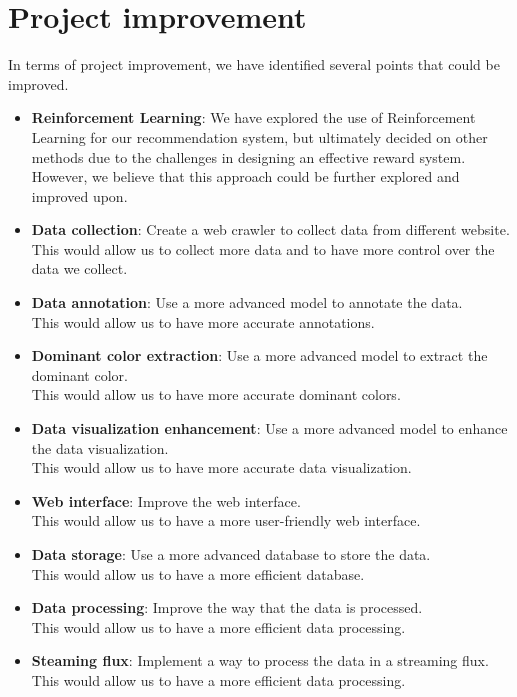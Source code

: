 \documentclass{article}
\begin{document}
    \section{Project improvement}\label{sec:project_improvement}
    In terms of project improvement, we have identified several points that could be improved.

    \begin{itemize}
        \item \textbf{Reinforcement Learning}: We have explored the use of Reinforcement Learning for our recommendation system, but ultimately decided on other methods due to the challenges in designing an effective reward system.\\However, we believe that this approach could be further explored and improved upon.
        \item \textbf{Data collection}: Create a web crawler to collect data from different website.\\This would allow us to collect more data and to have more control over the data we collect.
        \item \textbf{Data annotation}: Use a more advanced model to annotate the data.\\This would allow us to have more accurate annotations.
        \item \textbf{Dominant color extraction}: Use a more advanced model to extract the dominant color.\\This would allow us to have more accurate dominant colors.
        \item \textbf{Data visualization enhancement}: Use a more advanced model to enhance the data visualization.\\This would allow us to have more accurate data visualization.
        \item \textbf{Web interface}: Improve the web interface.\\This would allow us to have a more user-friendly web interface.
        \item \textbf{Data storage}: Use a more advanced database to store the data.\\This would allow us to have a more efficient database.
        \item \textbf{Data processing}: Improve the way that the data is processed.\\This would allow us to have a more efficient data processing.
        \item \textbf{Steaming flux}: Implement a way to process the data in a streaming flux.\\This would allow us to have a more efficient data processing.

\end{itemize}
\end{document}
